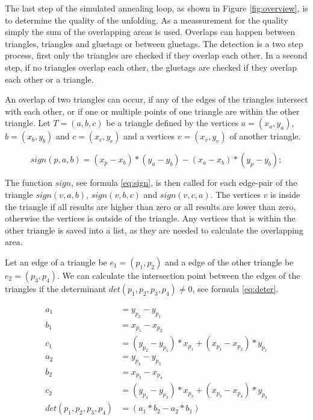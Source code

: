 \documentclass[draft,final]{vutinfth} %
\begin{document}
The last step of the simulated annealing loop, as shown in Figure \ref{fig:overview}, is to determine the quality of the unfolding. As a meassurement for the quality simply the sum of the overlapping areas is used. Overlaps can happen between triangles, triangles and gluetags or between gluetags. The detection is a two step process, first only the triangles are checked if they overlap each other. In a second step, if no triangles overlap each other, the gluetags are checked if they overlap each other or a triangle.

An overlap of two triangles can occur, if any of the edges of the triangles intersect with each other, or if one or multiple points of one triangle are within the other triangle. Let $T = (a,b,c)$ be a triangle defined by the vertices $a = (x_a, y_a)$, $b = (x_b, y_b)$ and $c = (x_c, y_c)$ and a vertices $v = (x_v, y_v)$ of another triangle.

\begin{equation}
\label{eq:sign}
sign(p, a, b) = (x_p - x_b) * (y_a - y_b) - (x_a - x_b) * (y_p - y_b);
\end{equation}

The function $sign$, see formula \ref{eq:sign}, is then called for each edge-pair of the triangle $sign(v, a, b)$, $sign(v, b, c)$ and $sign(v, c, a)$. The vertices $v$ is inside the triangle if all results are higher than zero or all results are lower than zero, otherwise the vertices is outside of the triangle.
Any vertices that is within the other triangle is saved into a list, as they are needed to calculate the overlapping area.

Let an edge of a triangle be $e_1 = (p_1, p_2)$ and a edge of the other triangle be $e_2 = (p_3, p_4)$. We can calculate the intersection point between the edges of the triangles if the determinant $det(p_1, p_2, p_3, p_4) \neq 0$, see formula \ref{eq:deter}.


\begin{align}
\begin{split}
a_1 &= y_{p_2} - y_{p_1}\\
b_1 &= x_{p_1} - x_{p_2}\\
c_1 &= (y_{p_2} - y_{p_1}) * x_{p_1} + (x_{p_1} - x_{p_2}) * y_{p_1}\\
a_2 &= y_{p_4} - y_{p_3}\\
b_2 &= x_{p_3} - x_{p_4}\\
c_2 &= (y_{p_4} - y_{p_3}) * x_{p_3} + (x_{p_3} - x_{p_4}) * y_{p_3}\\
det(p_1, p_2, p_3, p_4) &= (a_1*b_2 - a_2*b_1)
\end{split}
\label{eq:deter}
\end{align}
\end{document}
